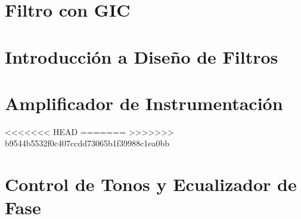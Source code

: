 








\tableofcontents
\newpage


\section{Filtro con GIC}
	
\newpage	
\section{Introducción a Diseño de Filtros}
    
\newpage
\section{Amplificador de Instrumentación}
    
<<<<<<< HEAD
    \newpage
=======
\newpage
>>>>>>> b9544b5532f0c407ccdd73065b1f39988c1ea0bb
\section{Control de Tonos y Ecualizador de Fase}
    




